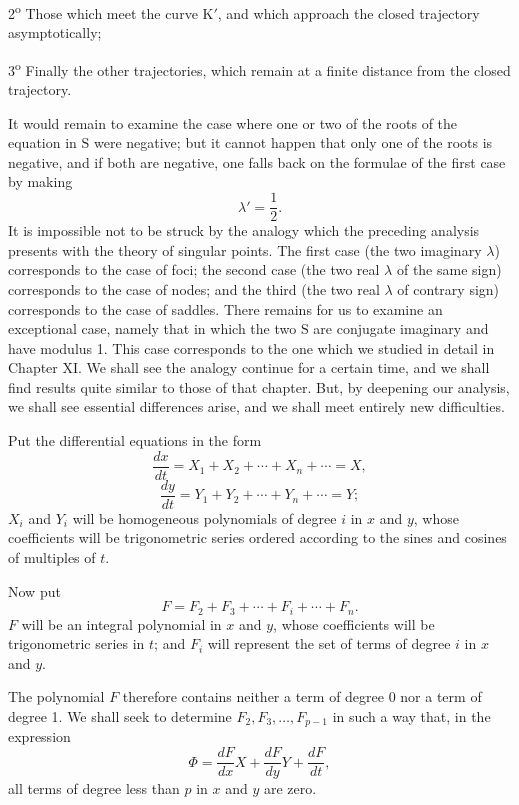 \documentclass[11pt]{article}
\begin{document}
2\textsuperscript{o} Those which meet the curve K$'$, and which approach the closed trajectory asymptotically;

3\textsuperscript{o} Finally the other trajectories, which remain at a finite distance from the closed trajectory.

It would remain to examine the case where one or two of the roots of the equation in $\mathrm{S}$ were negative; but it cannot happen that only one of the roots is negative, and if both are negative, one falls back on the formulae of the first case by making
\[
\lambda'=\frac12.
\]
It is impossible not to be struck by the analogy which the preceding analysis presents with the theory of singular points. The first case (the two imaginary $\lambda$) corresponds to the case of foci; the second case (the two real $\lambda$ of the same sign) corresponds to the case of nodes; and the third (the two real $\lambda$ of contrary sign) corresponds to the case of saddles. There remains for us to examine an exceptional case, namely that in which the two $\mathrm{S}$ are conjugate imaginary and have modulus 1. This case corresponds to the one which we studied in detail in Chapter XI. We shall see the analogy continue for a certain time, and we shall find results quite similar to those of that chapter. But, by deepening our analysis, we shall see essential differences arise, and we shall meet entirely new difficulties.

Put the differential equations in the form
\[
\frac{dx}{dt}=X_1+X_2+\cdots+X_n+\cdots=X,
\]
\[
\frac{dy}{dt}=Y_1+Y_2+\cdots+Y_n+\cdots=Y;
\]
$X_i$ and $Y_i$ will be homogeneous polynomials of degree $i$ in $x$ and $y$, whose coefficients will be trigonometric series ordered according to the sines and cosines of multiples of $t$.

Now put
\[
F=F_2+F_3+\cdots+F_i+\cdots+F_n.
\]
$F$ will be an integral polynomial in $x$ and $y$, whose coefficients will be trigonometric series in $t$; and $F_i$ will represent the set of terms of degree $i$ in $x$ and $y$.

The polynomial $F$ therefore contains neither a term of degree 0 nor a term of degree 1. We shall seek to determine $F_2,F_3,\ldots,F_{p-1}$ in such a way that, in the expression
\[
\Phi=\frac{dF}{dx}X+\frac{dF}{dy}Y+\frac{dF}{dt},
\]
all terms of degree less than $p$ in $x$ and $y$ are zero.
\end{document}
